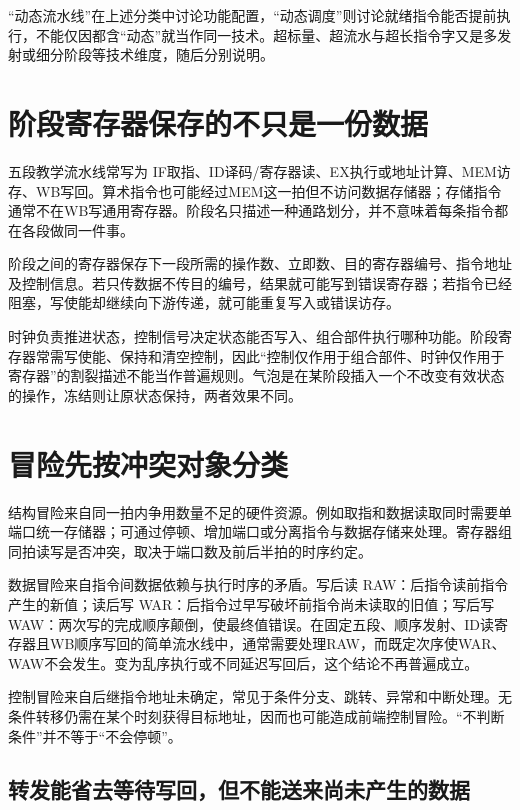 ``动态流水线''在上述分类中讨论功能配置，``动态调度''则讨论就绪指令能否提前执行，不能仅因都含``动态''就当作同一技术。超标量、超流水与超长指令字又是多发射或细分阶段等技术维度，随后分别说明。

\section{阶段寄存器保存的不只是一份数据}\label{CO05-stage-registers}

五段教学流水线常写为 IF取指、ID译码/寄存器读、EX执行或地址计算、MEM访存、WB写回。算术指令也可能经过MEM这一拍但不访问数据存储器；存储指令通常不在WB写通用寄存器。阶段名只描述一种通路划分，并不意味着每条指令都在各段做同一件事。

阶段之间的寄存器保存下一段所需的操作数、立即数、目的寄存器编号、指令地址及控制信息。若只传数据不传目的编号，结果就可能写到错误寄存器；若指令已经阻塞，写使能却继续向下游传递，就可能重复写入或错误访存。

时钟负责推进状态，控制信号决定状态能否写入、组合部件执行哪种功能。阶段寄存器常需写使能、保持和清空控制，因此``控制仅作用于组合部件、时钟仅作用于寄存器''的割裂描述不能当作普遍规则。气泡是在某阶段插入一个不改变有效状态的操作，冻结则让原状态保持，两者效果不同。

\section{冒险先按冲突对象分类}\label{CO05-hazards}

结构冒险来自同一拍内争用数量不足的硬件资源。例如取指和数据读取同时需要单端口统一存储器；可通过停顿、增加端口或分离指令与数据存储来处理。寄存器组同拍读写是否冲突，取决于端口数及前后半拍的时序约定。

数据冒险来自指令间数据依赖与执行时序的矛盾。写后读 RAW：后指令读前指令产生的新值；读后写 WAR：后指令过早写破坏前指令尚未读取的旧值；写后写 WAW：两次写的完成顺序颠倒，使最终值错误。在固定五段、顺序发射、ID读寄存器且WB顺序写回的简单流水线中，通常需要处理RAW，而既定次序使WAR、WAW不会发生。变为乱序执行或不同延迟写回后，这个结论不再普遍成立。

控制冒险来自后继指令地址未确定，常见于条件分支、跳转、异常和中断处理。无条件转移仍需在某个时刻获得目标地址，因而也可能造成前端控制冒险。``不判断条件''并不等于``不会停顿''。

\subsection{转发能省去等待写回，但不能送来尚未产生的数据}\label{ux8f6cux53d1ux80fdux7701ux53bbux7b49ux5f85ux5199ux56deux4f46ux4e0dux80fdux9001ux6765ux5c1aux672aux4ea7ux751fux7684ux6570ux636e}

